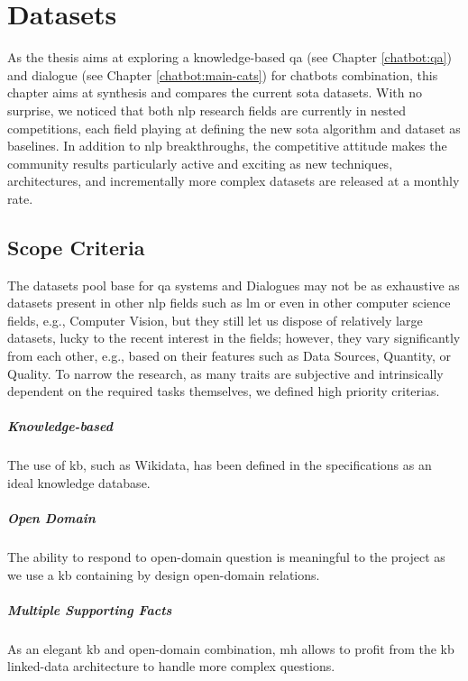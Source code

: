 \chapter{Datasets}
\label{chap:datasets}

As the thesis aims at exploring a knowledge-based \gls{qa} (see Chapter \ref{chatbot:qa}) and dialogue (see Chapter \ref{chatbot:main-cats}) for chatbots combination, this chapter aims at synthesis and compares the current \gls{sota} datasets. With no surprise, we noticed that both \gls{nlp} research fields are currently in nested competitions, each field playing at defining the new \gls{sota} algorithm and dataset as baselines. In addition to \gls{nlp} breakthroughs, the competitive attitude makes the community results particularly active and exciting as new techniques, architectures, and incrementally more complex datasets are released at a monthly rate.

\section{Scope Criteria}
\label{dataset:criterions}
The datasets pool base for \gls{qa} systems and Dialogues may not be as exhaustive as datasets present in other \gls{nlp} fields such as \gls{lm} or even in other computer science fields, e.g., Computer Vision, but they still let us dispose of relatively large datasets, lucky to the recent interest in the fields; however, they vary significantly from each other, e.g., based on their features such as Data Sources, Quantity, or Quality. To narrow the research, as many traits are subjective and intrinsically dependent on the required tasks themselves, we defined high priority criterias.

\paragraph{Knowledge-based}
The use of \gls{kb}, such as Wikidata, has been defined in the specifications as an ideal knowledge database. 

\paragraph{Open Domain}
The ability to respond to \gls{open-domain} question is meaningful to the project as we use a \gls{kb} containing by design \gls{open-domain} relations. 

\paragraph{Multiple Supporting Facts}
As an elegant \gls{kb} and \gls{open-domain} combination, \gls{mh} allows to profit from the \gls{kb} linked-data architecture to handle more complex questions.

